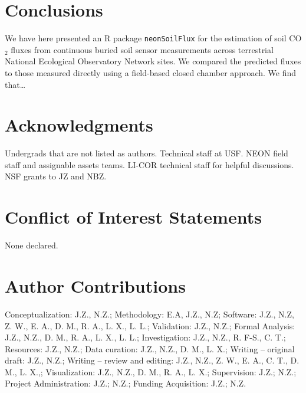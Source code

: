 \documentclass[
  letterpaper,
  DIV=11,
  numbers=noendperiod]{scrartcl}
\begin{document}
\section{Conclusions}\label{conclusions}

We have here presented an R package \texttt{neonSoilFlux} for the
estimation of soil CO\(_{2}\) fluxes from continuous buried soil sensor
measurements across terrestrial National Ecological Observatory Network
sites. We compared the predicted fluxes to those measured directly using
a field-based closed chamber approach. We find that\ldots{}

\section{Acknowledgments}\label{acknowledgments}

Undergrads that are not listed as authors. Technical staff at USF. NEON
field staff and assignable assets teams. LI-COR technical staff for
helpful discussions. NSF grants to JZ and NBZ.

\section{Conflict of Interest
Statements}\label{conflict-of-interest-statements}

None declared.

\section{Author Contributions}\label{author-contributions}

Conceptualization: J.Z., N.Z.; Methodology: E.A, J.Z., N.Z; Software:
J.Z., N.Z, Z. W., E. A., D. M., R. A., L. X., L. L.; Validation: J.Z.,
N.Z.; Formal Analysis: J.Z., N.Z., D. M., R. A., L. X., L. L.;
Investigation: J.Z., N.Z., R. F-S., C. T.; Resources: J.Z., N.Z.; Data
curation: J.Z., N.Z., D. M., L. X.; Writing -- original draft: J.Z.,
N.Z.; Writing -- review and editing: J.Z., N.Z., Z. W., E. A., C. T., D.
M., L. X.,; Visualization: J.Z., N.Z., D. M., R. A., L. X.; Supervision:
J.Z.; N.Z.; Project Administration: J.Z.; N.Z.; Funding Acquisition:
J.Z.; N.Z.
\end{document}
